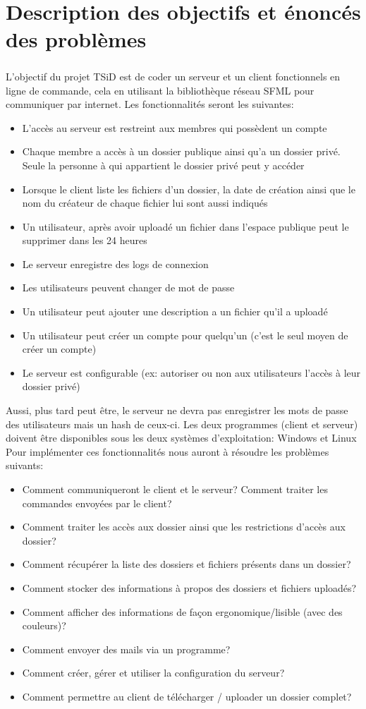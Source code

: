 \documentclass[12pt,a4paper,twoside]{article}
\begin{document}
	\section{Description des objectifs et énoncés des problèmes} %
		\subparagraph*{}
			L'objectif du projet TSiD est de coder un serveur et un client fonctionnels en ligne de commande, cela en utilisant la bibliothèque réseau SFML pour communiquer par internet.
			Les fonctionnalités seront les suivantes:
			\begin{itemize}
				\item{} L'accès au serveur est restreint aux membres qui possèdent un compte
				\item{} Chaque membre a accès à un dossier publique ainsi qu'a un dossier privé. Seule la personne à qui appartient le dossier privé peut y accéder
				\item{} Lorsque le client liste les fichiers d'un dossier, la date de création ainsi que le nom du créateur de chaque fichier lui sont aussi indiqués
				\item{} Un utilisateur, après avoir uploadé un fichier dans l'espace publique peut le supprimer dans les 24 heures
				\item{} Le serveur enregistre des logs de connexion
				\item{} Les utilisateurs peuvent changer de mot de passe
				\item{} Un utilisateur peut ajouter une description a un fichier qu'il a uploadé
				\item{} Un utilisateur peut créer un compte pour quelqu'un (c'est le seul moyen de créer un compte)
				\item{} Le serveur est configurable (ex: autoriser ou non aux utilisateurs l'accès à leur dossier privé)
			\end{itemize}
			Aussi, plus tard peut être, le serveur ne devra pas enregistrer les mots de passe des utilisateurs mais un hash de ceux-ci.
			Les deux programmes (client et serveur) doivent être disponibles sous les deux systèmes d'exploitation: Windows et Linux
			Pour implémenter ces fonctionnalités nous auront à résoudre les problèmes suivants:
			\begin{itemize}
				\item{} Comment communiqueront le client et le serveur? Comment traiter les commandes envoyées par le client?
				\item{} Comment traiter les accès aux dossier ainsi que les restrictions d'accès aux dossier?
				\item{} Comment récupérer la liste des dossiers et fichiers présents dans un dossier?
				\item{} Comment stocker des informations à propos des dossiers et fichiers uploadés?
				\item{} Comment afficher des informations de façon ergonomique/lisible (avec des couleurs)?
				\item{} Comment envoyer des mails via un programme?
				\item{} Comment créer, gérer et utiliser la configuration du serveur?
				\item{} Comment permettre au client de télécharger / uploader un dossier complet?
			\end{itemize}
\end{document}
